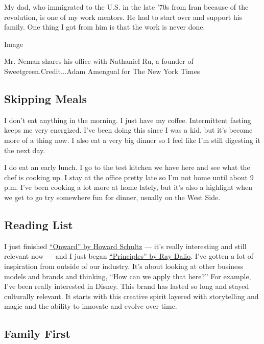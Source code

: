 My dad, who immigrated to the U.S. in the late '70s from Iran because of
the revolution, is one of my work mentors. He had to start over and
support his family. One thing I got from him is that the work is never
done.

Image

Mr. Neman shares his office with Nathaniel Ru, a founder of
Sweetgreen.Credit...Adam Amengual for The New York Times

\hypertarget{skipping-meals}{%
\subsection{Skipping Meals}\label{skipping-meals}}

I don't eat anything in the morning. I just have my coffee. Intermittent
fasting keeps me very energized. I've been doing this since I was a kid,
but it's become more of a thing now. I also eat a very big dinner so I
feel like I'm still digesting it the next day.

I do eat an early lunch. I go to the test kitchen we have here and see
what the chef is cooking up. I stay at the office pretty late so I'm not
home until about 9 p.m. I've been cooking a lot more at home lately, but
it's also a highlight when we get to go try somewhere fun for dinner,
usually on the West Side.

\hypertarget{reading-list}{%
\subsection{Reading List}\label{reading-list}}

I just finished
\href{https://www.amazon.com/Onward-Starbucks-Fought-without-Losing/dp/1609613821}{``Onward''
by Howard Schultz} --- it's really interesting and still relevant now
--- and I just began
\href{https://www.amazon.com/Principles-Life-Work-Ray-Dalio/dp/1501124021}{``Principles''
by Ray Dalio}. I've gotten a lot of inspiration from outside of our
industry. It's about looking at other business models and brands and
thinking, ``How can we apply that here?'' For example, I've been really
interested in Disney. This brand has lasted so long and stayed
culturally relevant. It starts with this creative spirit layered with
storytelling and magic and the ability to innovate and evolve over time.

\hypertarget{family-first}{%
\subsection{Family First}\label{family-first}}

